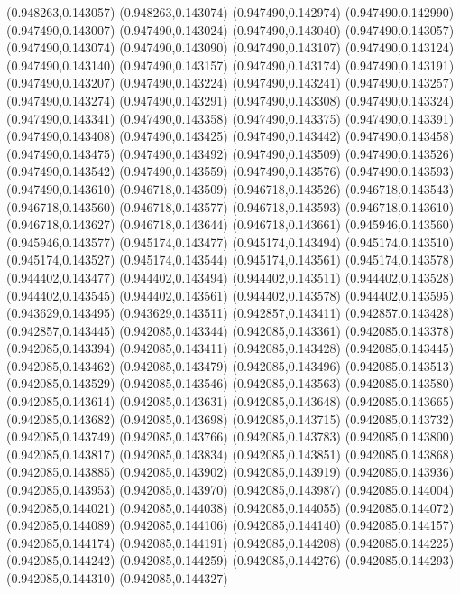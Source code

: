 (0.948263,0.143057)
(0.948263,0.143074)
(0.947490,0.142974)
(0.947490,0.142990)
(0.947490,0.143007)
(0.947490,0.143024)
(0.947490,0.143040)
(0.947490,0.143057)
(0.947490,0.143074)
(0.947490,0.143090)
(0.947490,0.143107)
(0.947490,0.143124)
(0.947490,0.143140)
(0.947490,0.143157)
(0.947490,0.143174)
(0.947490,0.143191)
(0.947490,0.143207)
(0.947490,0.143224)
(0.947490,0.143241)
(0.947490,0.143257)
(0.947490,0.143274)
(0.947490,0.143291)
(0.947490,0.143308)
(0.947490,0.143324)
(0.947490,0.143341)
(0.947490,0.143358)
(0.947490,0.143375)
(0.947490,0.143391)
(0.947490,0.143408)
(0.947490,0.143425)
(0.947490,0.143442)
(0.947490,0.143458)
(0.947490,0.143475)
(0.947490,0.143492)
(0.947490,0.143509)
(0.947490,0.143526)
(0.947490,0.143542)
(0.947490,0.143559)
(0.947490,0.143576)
(0.947490,0.143593)
(0.947490,0.143610)
(0.946718,0.143509)
(0.946718,0.143526)
(0.946718,0.143543)
(0.946718,0.143560)
(0.946718,0.143577)
(0.946718,0.143593)
(0.946718,0.143610)
(0.946718,0.143627)
(0.946718,0.143644)
(0.946718,0.143661)
(0.945946,0.143560)
(0.945946,0.143577)
(0.945174,0.143477)
(0.945174,0.143494)
(0.945174,0.143510)
(0.945174,0.143527)
(0.945174,0.143544)
(0.945174,0.143561)
(0.945174,0.143578)
(0.944402,0.143477)
(0.944402,0.143494)
(0.944402,0.143511)
(0.944402,0.143528)
(0.944402,0.143545)
(0.944402,0.143561)
(0.944402,0.143578)
(0.944402,0.143595)
(0.943629,0.143495)
(0.943629,0.143511)
(0.942857,0.143411)
(0.942857,0.143428)
(0.942857,0.143445)
(0.942085,0.143344)
(0.942085,0.143361)
(0.942085,0.143378)
(0.942085,0.143394)
(0.942085,0.143411)
(0.942085,0.143428)
(0.942085,0.143445)
(0.942085,0.143462)
(0.942085,0.143479)
(0.942085,0.143496)
(0.942085,0.143513)
(0.942085,0.143529)
(0.942085,0.143546)
(0.942085,0.143563)
(0.942085,0.143580)
(0.942085,0.143614)
(0.942085,0.143631)
(0.942085,0.143648)
(0.942085,0.143665)
(0.942085,0.143682)
(0.942085,0.143698)
(0.942085,0.143715)
(0.942085,0.143732)
(0.942085,0.143749)
(0.942085,0.143766)
(0.942085,0.143783)
(0.942085,0.143800)
(0.942085,0.143817)
(0.942085,0.143834)
(0.942085,0.143851)
(0.942085,0.143868)
(0.942085,0.143885)
(0.942085,0.143902)
(0.942085,0.143919)
(0.942085,0.143936)
(0.942085,0.143953)
(0.942085,0.143970)
(0.942085,0.143987)
(0.942085,0.144004)
(0.942085,0.144021)
(0.942085,0.144038)
(0.942085,0.144055)
(0.942085,0.144072)
(0.942085,0.144089)
(0.942085,0.144106)
(0.942085,0.144140)
(0.942085,0.144157)
(0.942085,0.144174)
(0.942085,0.144191)
(0.942085,0.144208)
(0.942085,0.144225)
(0.942085,0.144242)
(0.942085,0.144259)
(0.942085,0.144276)
(0.942085,0.144293)
(0.942085,0.144310)
(0.942085,0.144327)
